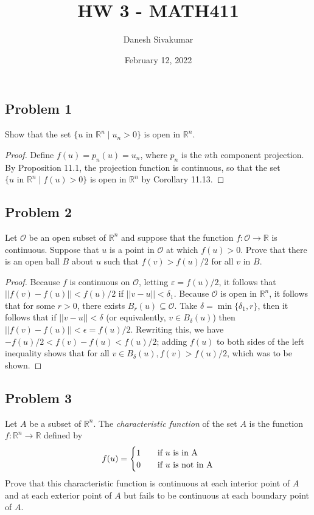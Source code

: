 \documentclass{article}
\title{HW 3 - MATH411}
\author{Danesh Sivakumar}
\date{February 12, 2022}
\begin{document}
\maketitle 


\subsection*{Problem 1}

Show that the set $\{u \text{ in } \mathbb{R}^n \mid u_n > 0\}$ is open in $\mathbb{R}^n$.

\begin{proof}

Define $f(u) = p_n(u) = u_n$, where $p_n$ is the $n$th component projection. By Proposition 11.1, the projection function is continuous, so that the set $\{u \text{ in } \mathbb{R}^n \mid f(u) > 0\}$ is open in $\mathbb{R}^n$ by Corollary 11.13.

\end{proof}


\subsection*{Problem 2}

Let $\mathcal{O}$ be an open subset of $\mathbb{R}^n$ and suppose that the function $f \colon \mathcal{O} \to \mathbb{R}$ is continuous. Suppose that $u$ is a point in $\mathcal{O}$ at which $f(u) > 0$. Prove that there is an open ball $B$ about $u$ such that $f(v) > f(u)/2$ for all $v$ in $B$.

\begin{proof}
Because $f$ is continuous on $\mathcal{O}$, letting $\varepsilon = f(u)/2$, it follows that $||f(v) - f(u)|| < f(u)/2$ if $||v-u|| < \delta_1$. Because $\mathcal{O}$ is open in $\mathbb{R}^n$, it follows that for some $r>0$, there exists $B_r(u) \subseteq \mathcal{O}$. Take $\delta = \min{\{\delta_1, r\}}$, then it follows that if $||v-u|| < \delta$ (or equivalently, $v \in B_\delta(u)$) then $||f(v) - f(u)|| < \epsilon = f(u)/2$. Rewriting this, we have $-f(u)/2 < f(v) - f(u) < f(u)/2$; adding $f(u)$ to both sides of the left inequality shows that for all $v \in B_\delta(u), f(v) > f(u)/2$, which was to be shown.
\end{proof}

\subsection*{Problem 3}
Let $A$ be a subset of $\mathbb{R}^n$. The \textit{characteristic function} of the set $A$ is the function $f \colon \mathbb{R}^n \to \mathbb{R}$ defined by 
\[ f(u)=\begin{cases}
          1 \quad &\text{if $u$ is in } $A$ \\
          0 \quad &\text{if $u$ is not in } $A$ \\
          \end{cases}\]
Prove that this characteristic function is continuous at each interior point of $A$ and at each exterior point of $A$ but fails to be continuous at each boundary point of $A$.
\end{document}
